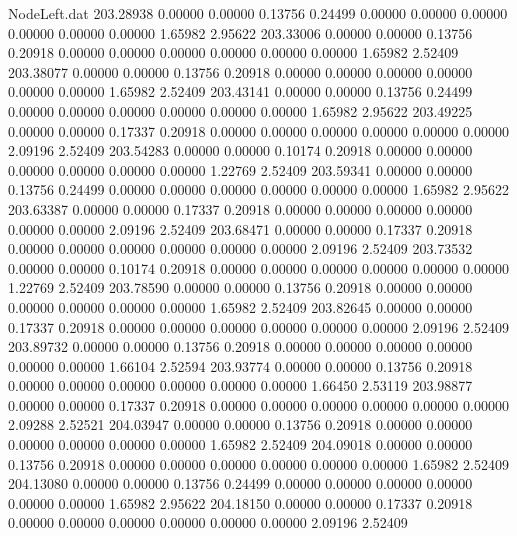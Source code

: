 \begin{filecontents}{NodeLeft.dat}
 203.28938    0.00000    0.00000     0.13756    0.24499    0.00000    0.00000    0.00000    0.00000    0.00000    0.00000    1.65982    2.95622
 203.33006    0.00000    0.00000     0.13756    0.20918    0.00000    0.00000    0.00000    0.00000    0.00000    0.00000    1.65982    2.52409
 203.38077    0.00000    0.00000     0.13756    0.20918    0.00000    0.00000    0.00000    0.00000    0.00000    0.00000    1.65982    2.52409
 203.43141    0.00000    0.00000     0.13756    0.24499    0.00000    0.00000    0.00000    0.00000    0.00000    0.00000    1.65982    2.95622
 203.49225    0.00000    0.00000     0.17337    0.20918    0.00000    0.00000    0.00000    0.00000    0.00000    0.00000    2.09196    2.52409
 203.54283    0.00000    0.00000     0.10174    0.20918    0.00000    0.00000    0.00000    0.00000    0.00000    0.00000    1.22769    2.52409
 203.59341    0.00000    0.00000     0.13756    0.24499    0.00000    0.00000    0.00000    0.00000    0.00000    0.00000    1.65982    2.95622
 203.63387    0.00000    0.00000     0.17337    0.20918    0.00000    0.00000    0.00000    0.00000    0.00000    0.00000    2.09196    2.52409
 203.68471    0.00000    0.00000     0.17337    0.20918    0.00000    0.00000    0.00000    0.00000    0.00000    0.00000    2.09196    2.52409
 203.73532    0.00000    0.00000     0.10174    0.20918    0.00000    0.00000    0.00000    0.00000    0.00000    0.00000    1.22769    2.52409
 203.78590    0.00000    0.00000     0.13756    0.20918    0.00000    0.00000    0.00000    0.00000    0.00000    0.00000    1.65982    2.52409
 203.82645    0.00000    0.00000     0.17337    0.20918    0.00000    0.00000    0.00000    0.00000    0.00000    0.00000    2.09196    2.52409
 203.89732    0.00000    0.00000     0.13756    0.20918    0.00000    0.00000    0.00000    0.00000    0.00000    0.00000    1.66104    2.52594
 203.93774    0.00000    0.00000     0.13756    0.20918    0.00000    0.00000    0.00000    0.00000    0.00000    0.00000    1.66450    2.53119
 203.98877    0.00000    0.00000     0.17337    0.20918    0.00000    0.00000    0.00000    0.00000    0.00000    0.00000    2.09288    2.52521
 204.03947    0.00000    0.00000     0.13756    0.20918    0.00000    0.00000    0.00000    0.00000    0.00000    0.00000    1.65982    2.52409
 204.09018    0.00000    0.00000     0.13756    0.20918    0.00000    0.00000    0.00000    0.00000    0.00000    0.00000    1.65982    2.52409
 204.13080    0.00000    0.00000     0.13756    0.24499    0.00000    0.00000    0.00000    0.00000    0.00000    0.00000    1.65982    2.95622
 204.18150    0.00000    0.00000     0.17337    0.20918    0.00000    0.00000    0.00000    0.00000    0.00000    0.00000    2.09196    2.52409

\end{filecontents}
